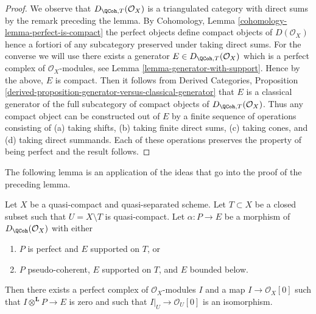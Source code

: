 \begin{proof}
We observe that $D_{\QCoh, T}(\mathcal{O}_X)$ is a triangulated
category with direct sums by the remark preceding the lemma.
By Cohomology, Lemma \ref{cohomology-lemma-perfect-is-compact}
the perfect objects define compact objects of $D(\mathcal{O}_X)$
hence a fortiori of any subcategory preserved under taking direct
sums. For the converse we will use there exists a generator
$E \in D_{\QCoh, T}(\mathcal{O}_X)$ which is a perfect complex
of $\mathcal{O}_X$-modules, see
Lemma \ref{lemma-generator-with-support}.
Hence by the above, $E$ is compact. Then it follows from
Derived Categories, Proposition
\ref{derived-proposition-generator-versus-classical-generator}
that $E$ is a classical generator of the full subcategory
of compact objects of $D_{\QCoh, T}(\mathcal{O}_X)$.
Thus any compact object can be constructed out of $E$ by
a finite sequence of operations consisting of
(a) taking shifts, (b) taking finite direct sums, (c) taking cones, and
(d) taking direct summands. Each of these operations preserves
the property of being perfect and the result follows.
\end{proof}

\noindent
The following lemma is an application of the ideas that go into
the proof of the preceding lemma.

\begin{lemma}
\label{lemma-map-from-pseudo-coherent-to-complex-with-support}
Let $X$ be a quasi-compact and quasi-separated scheme. Let $T \subset X$
be a closed subset such that $U = X \setminus T$ is quasi-compact.
Let $\alpha : P \to E$ be a morphism of $D_\QCoh(\mathcal{O}_X)$ with
either
\begin{enumerate}
\item $P$ is perfect and $E$ supported on $T$, or
\item $P$ pseudo-coherent, $E$ supported on $T$, and $E$ bounded below.
\end{enumerate}
Then there exists a perfect complex of $\mathcal{O}_X$-modules $I$
and a map $I \to \mathcal{O}_X[0]$ such that
$I \otimes^\mathbf{L} P \to E$ is zero and such that
$I|_U \to \mathcal{O}_U[0]$ is an
isomorphism.
\end{lemma}

